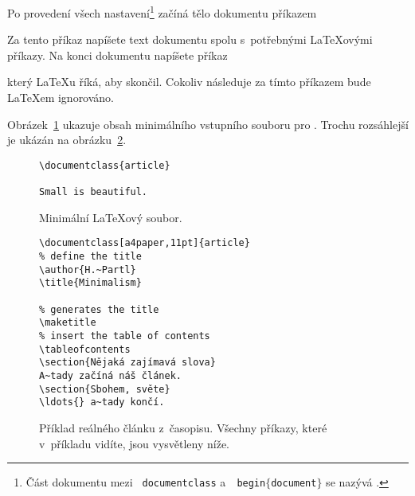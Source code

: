 Po provedení všech nastavení\footnote{Část dokumentu mezi \texttt{\bs
    documentclass} a~\texttt{\bs
    begin$\mathtt{\{}$document$\mathtt{\}}$} se nazývá
  \emph{}.} začíná tělo dokumentu příkazem

\begin{code}
\verb||
\end{code}

Za tento příkaz napíšete text dokumentu spolu s~potřebnými \LaTeX ovými
příkazy. Na konci dokumentu napíšete příkaz

\begin{code}
\verb||
\end{code}
který \LaTeX u říká, aby skončil. Cokoliv následuje za tímto příkazem
bude \LaTeX em ignorováno.

Obrázek~\ref{mini} ukazuje obsah minimálního vstupního souboru pro \LaTeXe{}.
Trochu rozsáhlejší  je ukázán na
obrázku~\ref{document}.

\begin{figure}[!bp]
\begin{lined}{6cm}
\begin{verbatim}
\documentclass{article}

Small is beautiful.

\end{verbatim}
\end{lined}
\caption{Minimální \LaTeX ový soubor.} \label{mini}
\end{figure}
 
\begin{figure}[!bp]
\begin{lined}{10cm}
\begin{verbatim}
\documentclass[a4paper,11pt]{article}
% define the title
\author{H.~Partl}
\title{Minimalism}

% generates the title
\maketitle 
% insert the table of contents
\tableofcontents
\section{Nějaká zajímavá slova}
A~tady začíná náš článek.
\section{Sbohem, světe}
\ldots{} a~tady končí.

\end{verbatim}
\end{lined}
\caption[Příklad reálného článku z~časopisu.]{Příklad reálného
článku z~časopisu. Všechny příkazy, které v~příkladu
vidíte, jsou vysvětleny níže.} \label{document}

\end{figure}

